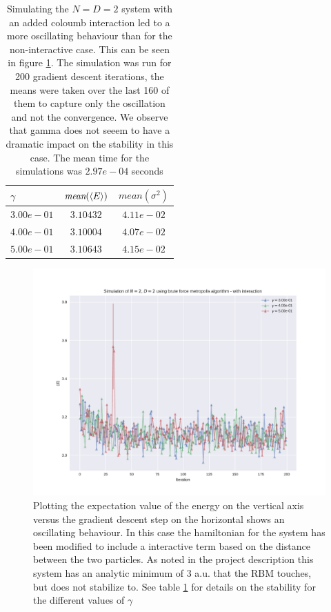 \begin{table}
	\begin{tabular}{|l|c|c|}
	\hline
$\gamma$ & $\textit{mean}(\langle E \rangle)$ & $\textit{mean}(\sigma ^2)$ \\
\hline \hline
$3.00e-01$ & $3.10432$ & $4.11e-02$ \\
$4.00e-01$ &  $3.10004$ & $4.07e-02$ \\
$5.00e-01$ &  $3.10643$ & $4.15e-02$ \\
\hline
	\end{tabular}
\caption{Simulating the $N = D = 2$ system with an added coloumb interaction led to a more oscillating behaviour than for the non-interactive case. This can be seen in figure \ref{fig:inter}. The simulation was run for 200 gradient descent iterations, the means were taken over the last 160 of them to capture only the oscillation and not the convergence. We observe that gamma does not seeem to have a dramatic impact on the stability in this case. The mean time for the simulations was $2.97e-04$ seconds}\label{tab:inter}
\end{table}


\begin{figure}
	\includegraphics[width = \textwidth]{figures/interactive_naive.pdf}
\caption{Plotting the expectation value of the energy on the vertical axis versus the gradient descent step on the horizontal shows an oscillating behaviour. In this case the hamiltonian for the system has been modified to include a interactive term based on the distance between the two particles. As noted in the project description this system has an analytic minimum of 3 a.u. that the RBM touches, but does not stabilize to. See table \ref{tab:inter} for details on the stability for the different values of $\gamma$} \label{fig:inter}
\end{figure}
